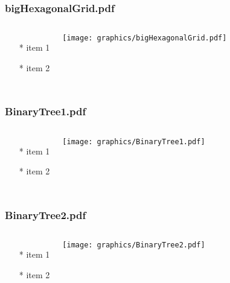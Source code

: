 \documentclass{beamer}
\begin{document}
\begin{frame} \frametitle{bigHexagonalGrid.pdf}
    \begin{columns}[c]
        \begin{itemize}
            \item[*] item 1
            \item[*] item 2
        \end{itemize}
        \begin{minipage}{\linewidth}
            \begin{center}
            \texttt{[image: graphics/bigHexagonalGrid.pdf]}
            \label{gfx:bigHexagonalGrid.pdf}
            \end{center}
        \end{minipage}
    \end{columns}
\end{frame}
\begin{frame} \frametitle{BinaryTree1.pdf}
    \begin{columns}[c]
        \begin{itemize}
            \item[*] item 1
            \item[*] item 2
        \end{itemize}
        \begin{minipage}{\linewidth}
            \begin{center}
            \texttt{[image: graphics/BinaryTree1.pdf]}
            \label{gfx:BinaryTree1.pdf}
            \end{center}
        \end{minipage}
    \end{columns}
\end{frame}
\begin{frame} \frametitle{BinaryTree2.pdf}
    \begin{columns}[c]
        \begin{itemize}
            \item[*] item 1
            \item[*] item 2
        \end{itemize}
        \begin{minipage}{\linewidth}
            \begin{center}
            \texttt{[image: graphics/BinaryTree2.pdf]}
            \label{gfx:BinaryTree2.pdf}
            \end{center}
        \end{minipage}
    \end{columns}
\end{frame}
\end{document}
